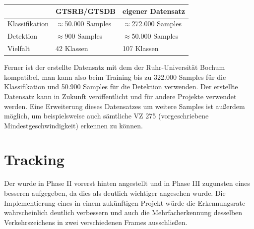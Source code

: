 \documentclass[12pt,a4paper,ngerman,enabledeprecatedfontcommands]{scrreprt}
\begin{document}
\begin{tabu}{|X[l]|X[r]|X[r]|}
    \hline
    ~               & GTSRB/GTSDB               & eigener Datensatz         \\  \hline
    Klassifikation  & $\approx$50.000 Samples   & $\approx$272.000 Samples  \\
    Detektion       & $\approx$900 Samples      & $\approx$50.000 Samples   \\  
    Vielfalt        & 42 Klassen                & 107 Klassen               \\
    \hline
\end{tabu}
\bigskip

Ferner ist der erstellte Datensatz mit dem der Ruhr-Universität Bochum kompatibel, man kann also beim Training bis zu 322.000 \gls{Sample}s für die \gls{Klassifikation} und 50.900 \gls{Sample}s für die \gls{Detektion} verwenden. Der erstellte Datensatz kann in Zukunft veröffentlicht und für andere Projekte verwendet werden. Eine Erweiterung dieses Datensatzes um weitere \gls{Sample}s ist außerdem möglich, um beispielsweise auch sämtliche \gls{VZ} 275 (vorgeschriebene Mindestgeschwindigkeit) erkennen zu können.\\

\section{Tracking}
Der  wurde in Phase II vorerst hinten angestellt und in Phase III zugunsten eines besseren  aufgegeben, da dies als deutlich wichtiger angesehen wurde. Die Implementierung eines  in einem zukünftigen Projekt würde die Erkennungsrate wahrscheinlich deutlich verbessern und auch die Mehrfacherkennung desselben Verkehrszeichens in zwei verschiedenen Frames ausschließen.\\
\end{document}
